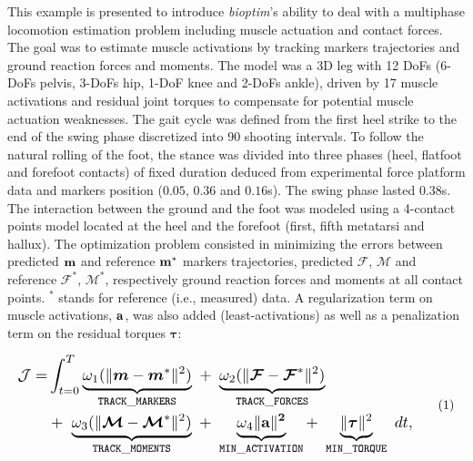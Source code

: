 This example is presented to introduce \textit{bioptim}'s ability to deal with a multiphase locomotion estimation problem including muscle actuation and contact forces.
The goal was to estimate muscle activations by tracking markers trajectories and ground reaction forces and moments. 
The model was a 3D leg with 12 DoFs (6-DoFs pelvis, 3-DoFs hip, 1-DoF knee and 2-DoFs ankle), driven by 17 muscle activations and residual joint torques to compensate for potential muscle actuation weaknesses. 
The gait cycle was defined from the first heel strike to the end of the swing phase discretized into 90 shooting intervals. 
To follow the natural rolling of the foot, the stance was divided into three phases (heel, flatfoot and forefoot contacts) of fixed duration deduced from experimental force platform data and markers position ($0.05$, $0.36$ and $0.16$\:s).
The swing phase lasted $0.38$\:s. 
The interaction between the ground and the foot was modeled using a 4-contact points model located at the heel and the forefoot (first, fifth metatarsi and hallux).
The optimization problem consisted in minimizing the errors between predicted $\bf{m}$ and reference $\bf{m}^*$ markers trajectories, predicted $\bm{\mathcal{F}}$, $\bm{\mathcal{M}}$ and reference $\bm{\mathcal{F}^*}$, $\bm{\mathcal{M}}^*$, respectively ground reaction forces and moments at all contact points.
$^*$ stands for reference (i.e., measured) data.
A regularization term on muscle activations, $\bf{a}$, was also added (least-activations) as well as a penalization term on the residual torques $\boldsymbol{\tau}$:

\[ 
\resizebox{0.9\columnwidth}{!}{$ 
\begin{aligned}
\mathcal{J} = &\int_{t=0}^{T}\underbrace{\omega_1(\|\bm{m} - \bm{m}^*\|^{2})}_{\mathtt{TRACK\_MARKERS}}~ 
+ ~ \underbrace{\omega_2(\|\bm{\mathcal{F}} - \bm{\mathcal{F}}^*\|^{2})}_{\mathtt{TRACK\_FORCES}}\\
&+ ~ \underbrace{\omega_3(\|\bm{\mathcal{M}} - \bm{\mathcal{M}}^*\|^{2})}_{\mathtt{TRACK\_MOMENTS}}~
+ ~ \underbrace{\omega_4\|\bf{a}\|^2}_{\mathtt{MIN\_ACTIVATION}}
+ ~ \underbrace{\|\boldsymbol{\tau}\|^2}_{\mathtt{MIN\_TORQUE}}~dt, 
\end{aligned}  
$}  
\addtag  
\label{eq:ocp_walk}  
\]

